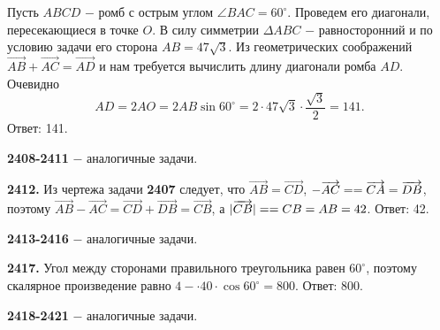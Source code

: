 Пусть $ABCD$ $-$ ромб с острым углом $\angle BAC = 60^\circ$. Проведем его диагонали, пересекающиеся в точке $O$. В силу симметрии $\Delta ABC$ $-$ равносторонний и по условию задачи его сторона $AB=47\sqrt{3}$. Из геометрических соображений $\overrightarrow{AB}+\overrightarrow{AC}=\overrightarrow{AD}$
и нам требуется вычислить длину диагонали ромба $AD$. Очевидно
\[
AD=2AO=2AB\sin{60^\circ}=2\cdot47\sqrt{3}\cdot\frac{\sqrt{3}}{2}=141.
\]  \newline \null \hspace*{\fill} Ответ: 141. 

\textbf{2408-2411} $-$ аналогичные задачи.

\textbf{2412.} Из чертежа задачи \textbf{2407} следует, что $\overrightarrow{AB}=\overrightarrow{CD}$, $-\overrightarrow{AC}=\linebreak=\overrightarrow{CA} = \overrightarrow{DB}$, поэтому $\overrightarrow{AB}-\overrightarrow{AC}=\overrightarrow{CD}+\overrightarrow{DB}=\overrightarrow{CB}$, а $|\overrightarrow{CB}|=\linebreak=CB=AB=42$. \newline \null \hspace*{\fill} Ответ: 42.
 
\textbf{2413-2416} $-$ аналогичные задачи.

\textbf{2417.}  Угол между сторонами правильного треугольника равен $60^\circ$, поэтому скалярное произведение равно $4-\cdot40\cdot\cos{60^\circ}=800$. \newline \null \hspace*{\fill} Ответ: 800.

\textbf{2418-2421} $-$ аналогичные задачи.
